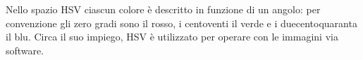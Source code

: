 \documentclass{subfiles}
\begin{document}
Nello spazio HSV ciascun colore è descritto in funzione di un angolo:
per convenzione gli zero gradi sono il rosso, i centoventi il verde e i duecentoquaranta il blu.
Circa il suo impiego, HSV è utilizzato per operare con le immagini via software.
\end{document}
